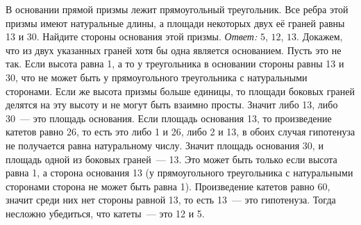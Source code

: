 \problem
В основании прямой призмы лежит прямоугольный треугольник.
Все ребра этой призмы имеют натуральные длины, а площади некоторых двух её
граней равны 13 и 30.
Найдите стороны основания этой призмы.
\solution
\emph{Ответ:} $5$, $12$, $13$.
Докажем, что из двух указанных граней хотя бы одна является основанием.
Пусть это не так.
Если высота равна 1, а то у треугольника в основании стороны равны 13 и 30, что
не может быть у прямоугольного треугольника с натуральными сторонами.
Если же высота призмы больше единицы, то площади боковых граней делятся на эту
высоту и не могут быть взаимно просты.
Значит либо 13, либо 30~--- это площадь основания.
Если площадь основания 13, то произведение катетов равно 26, то есть это либо 1
и 26, либо 2 и 13, в обоих случая гипотенуза не получается равна натуральному
числу.
Значит площадь основания 30, и площадь одной из боковых граней~--- 13.
Это может быть только если высота равна 1, а сторона основания 13
(у прямоугольного треугольника с натуральными сторонами сторона не может быть
равна 1).
Произведение катетов равно 60, значит среди них нет стороны равной 13, то есть
13~--- это гипотенуза.
Тогда несложно убедиться, что катеты~--- это 12 и 5.
\endproblem
